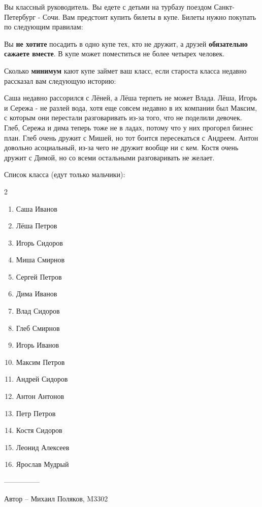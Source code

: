 \question
Вы классный руководитель. Вы едете с детьми на турбазу поездом Санкт-Петербург - Сочи. Вам предстоит купить билеты в купе. Билеты нужно покупать по следующим правилам:

Вы \textbf{не хотите} посадить в одно купе тех, кто не дружит, а друзей \textbf{обязательно сажаете вместе}. В купе может поместиться не более четырех человек.

Сколько \textbf{минимум} кают купе займет ваш класс, если староста класса недавно рассказал вам следующую историю:

Саша недавно рассорился с Лёней, а Лёша терпеть не может Влада. Лёша, Игорь и Сережа - не разлей вода, хотя еще совсем недавно в их компании был Максим, с которым они перестали разговаривать из-за того, что не поделили девочек. Глеб, Сережа и дима теперь тоже не в ладах, потому что у них прогорел бизнес план. Глеб очень дружит с Мишей, но тот боится пересекаться с Андреем. Антон довольно асоциальный, из-за чего не дружит вообще ни с кем. Костя очень дружит с Димой, но со всеми остальными разговаривать не желает.

Список класса (едут только мальчики):

\begin{multicols}{2}
\begin{enumerate}
\item Саша Иванов
\item Лёша Петров
\item Игорь Сидоров
\item Миша Смирнов
\item Сергей Петров
\item Дима Иванов
\item Влад Сидоров
\item Глеб Смирнов
\item Игорь Иванов
\item Максим Петров
\item Андрей Сидоров
\item Антон Антонов
\item Петр Петров
\item Костя Сидоров
\item Леонид Алексеев
\item Ярослав Мудрый
\end{enumerate}
\end{multicols}

---------------

Автор -- Михаил Поляков, M3302
